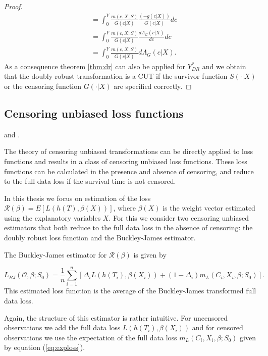 \documentclass[12pt, a4paper]{scrartcl}
\theoremstyle{definition}
\theoremstyle{plain}
\numberwithin{equation}{section}
\numberwithin{figure}{section}
\numberwithin{table}{section}
\begin{document}
\begin{proof}
\begin{equation*}
\begin{split}
		& = \int_{0}^{Y}\frac{m(c,X;S)}{G(c\vert X)}\frac{(-g(c\vert X))}{G(c\vert X)}dc\\
		&= \int_{0}^{Y}\frac{m(c,X;S)}{G(c\vert X)}\frac{d\Lambda_G(c \vert X)}{dc}dc\\
		&= \int_{0}^{Y}\frac{m(c,X;S)}{G(c\vert X)}d\Lambda_G(c \vert X).
		\end{split}
		\end{equation*}
		As a consequence theorem \ref{thm:dr} can also be applied for $Y_{DR}^*$ and we obtain that the doubly robust transformation is a CUT if the survivor function $S(\cdot\vert X)$ or the censoring function $G(\cdot\vert X)$ are specified correctly.
	\end{proof}

	\subsection{Censoring unbiased loss functions}\label{sec:cudls}
	\citet*{culs} and \citet*{basearticle}.
	
	The theory of censoring unbiased transformations can be directly applied to loss functions and results in a class of censoring unbiased loss functions. 
	These loss functions can be calculated in the presence and absence of censoring, and reduce to the full data loss if the survival time is not censored.
	
	In this thesis we focus on estimation of the loss $\mathcal{R} (\beta) = E[L(h(T),\beta(X))]$, where $\beta(X)$ is the weight vector estimated using the explanatory variables $X$.
	For this we consider two censoring unbiased estimators that both reduce to the full data loss in the absence of censoring: the doubly robust loss function and the Buckley-James estimator.
	
	
	The Buckley-James estimator for $\mathcal{R}(\beta)$ is given by
	
	\begin{equation}\label{eq:bj}
	L_{BJ}(\mathcal{O}, \beta; S_0) = \frac{1}{n} \sum_{i=1}^n \left[ \Delta_i L(h(T_i), \beta(X_i))+(1-\Delta_i)m_L(C_i, X_i, \beta; S_0)\right].
	\end{equation}
	This estimated loss function is the average of the Buckley-James transformed full data loss.
	
	Again, the structure of this estimator is rather intuitive.
	For uncensored observations we add the full data loss $L(h(T_i), \beta(X_i))$ and for censored observations we use the expectation of the full data loss $m_L(C_i, X_i, \beta; S_0)$ given by equation (\ref{eq:exploss}).
	
\end{document}
